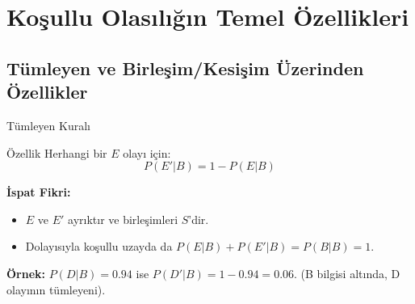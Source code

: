 \documentclass[light]{lutbeamer}
\begin{document}
\section{Koşullu Olasılığın Temel Özellikleri}
\subsection{Tümleyen ve Birleşim/Kesişim Üzerinden Özellikler}
\begin{frame}[fragile]{Tümleyen Kuralı}
    \begin{block}{Özellik}
        Herhangi bir $E$ olayı için:
        \[ P(E'|B) = 1 - P(E|B) \]
    \end{block}

    \textbf{İspat Fikri:}
    \begin{itemize}
        \item $E$ ve $E'$ ayrıktır ve birleşimleri $S$'dir.
        \item Dolayısıyla koşullu uzayda da $P(E|B) + P(E'|B) = P(B|B) = 1$.
    \end{itemize}
    
    \vspace{0.2cm}
    \textbf{Örnek:} $P(D|B) = 0.94$ ise $P(D'|B) = 1 - 0.94 = 0.06$.
    (B bilgisi altında, D olayının tümleyeni).
\end{frame}
\end{document}
